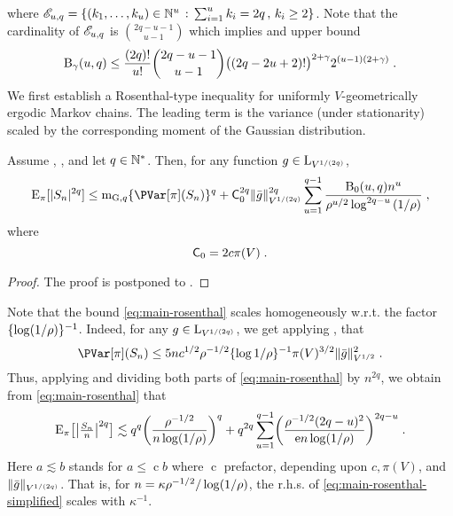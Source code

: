 \documentclass[sn-mathphys,Numbered]{sn-jnl}%
\begin{document}
where $\scrE_{u,q} = \{ (k_1,\ldots,k_u) \in \nset^u \, : \, \sum_{i=1}^u k_i = 2q\, ,\, k_i \geq 2\}$.
Note that the cardinality of $\scrE_{u,q}$ is $\binom{2q-u-1}{u-1}$ which implies and upper bound
\begin{equation}
\label{eq:bound-Balpha}
\ConstB_{\gamma}(u,q)
\leq \frac{(2q)!}{u!} \binom{2q-u-1}{u-1} \bigl((2q-2u+2)!\bigr)^{2+\gamma} 2^{(u-1)(2+\gamma)}\eqsp.
\end{equation}
We first establish a Rosenthal-type inequality for uniformly $V$-geometrically ergodic Markov chains. The leading term is the variance (under stationarity) scaled by the corresponding moment of the Gaussian distribution.
\begin{theorem}\label{th:rosenthal_V_q}
Assume , , and let $q \in \nset^*$. Then, for any function $g \in \mrl_{V^{1/(2q)}}$, 
\begin{equation}
\label{eq:main-rosenthal}
\PE_\pi[|S_n|^{2q}] \leq \momentGq[q] \{\PVar[\pi](S_n)\}^q + \Constmainros^{2q} \Vnorm[V^{1/(2q)}]{\bar{g}}^{2q}
\sum_{u=1}^{q-1} \frac{\ConstB_0(u,q) n^{u}}{\ratev^{u/2} \log^{2q-u}{(1/\ratev)}}\eqsp,
\end{equation}
where
\begin{equation}
\label{eq:constmainros}
\Constmainros = 2 \cmconstv \pi(V)\eqsp.
\end{equation}
\end{theorem}
\begin{proof}
The proof is postponed to .
\end{proof}
\begin{remark}
\label{remark:theo_1_scaling_mix_time}
Note that the bound \eqref{eq:main-rosenthal} scales homogeneously w.r.t. the factor $\{\log(1/\ratev)\}^{-1}$. Indeed, for any $g \in \mrl_{V^{1/(2q)}}$, we get applying , that 
\[
\PVar[\pi](S_n) \leq 5 n c^{1/2} \ratev^{-1/2} \{\log{1/\ratev}\}^{-1} \pi(V)^{3/2} \Vnorm[V^{1/2}]{\bar{g}}^{2}\eqsp.
\]
Thus, applying  and dividing both parts of \eqref{eq:main-rosenthal} by $n^{2q}$, we obtain from \eqref{eq:main-rosenthal} that
\begin{equation}
\label{eq:main-rosenthal-simplified}
\PE_\pi\bigl[\bigl|\tfrac{S_n}{n}\bigr|^{2q}\bigr] \lesssim q^{q} \biggl(\frac{\ratev^{-1/2}}{n \log(1/\ratev)}\biggr)^{q} + q^{2q} \sum_{u=1}^{q-1} \biggl(\frac{\ratev^{-1/2} (2q-u)^{2}}{\rme n \log(1/\ratev)}\biggr)^{2q-u}\eqsp.
\end{equation}
Here $ a \lesssim b $ stands for $a \leq \operatorname{c} b$ where $\operatorname{c}$ prefactor, depending upon $c, \pi(V)$, and $\Vnorm[V^{1/(2q)}]{\bar{g}}$. That is, for $n = \kappa \ratev^{-1/2} / \log(1/\ratev)$, the r.h.s. of \eqref{eq:main-rosenthal-simplified} scales with $\kappa^{-1}$. 
\end{remark}
\end{document}

